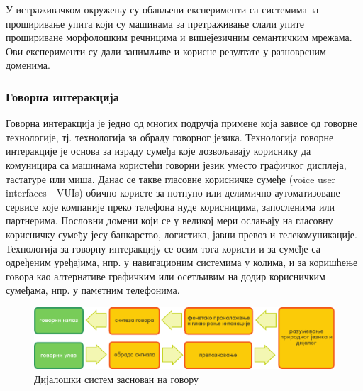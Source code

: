 {\begin{multicols}{2}
У истраживачком окружењу су обављени експерименти са системима за проширивање упита који су машинама за претраживање слали упите прошириване морфолошким речницима и вишејезичним семантичким мрежама. Ови експерименти су дали занимљиве и корисне резултате у разноврсним доменима. 

 \subsubsection {Говорна интеракција}
   
Говорна интеракција је једно од многих подручја примене која зависе од говорне технологије, тј. технологија за обраду говорног језика. Технологија говорне интеракције је основа за израду сумеђа  које дозвољавају кориснику да комуницира са машинама користећи говорни језик уместо графичког дисплеја, тастатуре или миша. Данас се такве гласовне корисничке сумеђе (voice user interfaces - VUIs) обично користе за потпуно или делимично аутоматизоване сервисе које компаније преко телефона нуде корисницима, запосленима или партнерима. Пословни домени који се у великој мери ослањају на гласовну корисничку сумеђу јесу банкарство, логистика, јавни превоз и телекомуникације. Технологија за говорну интеракцију се осим тога користи и за сумеђе са одређеним уређајима, нпр. у навигационим системима у колима, и за коришћење говора као алтернативе графичким или осетљивим на додир корисничким сумеђама, нпр. у паметним телефонима. 

\begin{figure}[htb]
  \center 
  \includegraphics[width=\textwidth]{../_media/serbian/simple_speech-based_dialogue_architecture}
  \caption{Дијалошки систем заснован на говору}
  \label{fig:dialoguearch_sr}
\end{figure}   



\end{multicols}}
